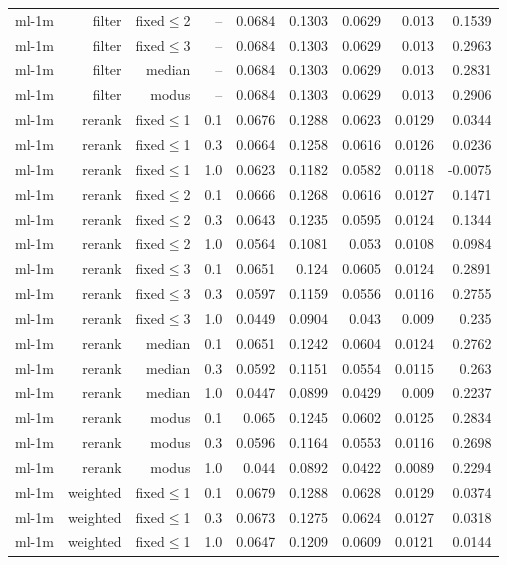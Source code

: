 \begin{longtable}{lrrrrrrrr}
ml-1m & filter & fixed$\leq$2 & -- & 0.0684 & 0.1303 & 0.0629 & 0.013 & 0.1539 \\
ml-1m & filter & fixed$\leq$3 & -- & 0.0684 & 0.1303 & 0.0629 & 0.013 & 0.2963 \\
ml-1m & filter & median & -- & 0.0684 & 0.1303 & 0.0629 & 0.013 & 0.2831 \\
ml-1m & filter & modus & -- & 0.0684 & 0.1303 & 0.0629 & 0.013 & 0.2906 \\
ml-1m & rerank & fixed$\leq$1 & 0.1 & 0.0676 & 0.1288 & 0.0623 & 0.0129 & 0.0344 \\
ml-1m & rerank & fixed$\leq$1 & 0.3 & 0.0664 & 0.1258 & 0.0616 & 0.0126 & 0.0236 \\
ml-1m & rerank & fixed$\leq$1 & 1.0 & 0.0623 & 0.1182 & 0.0582 & 0.0118 & -0.0075 \\
ml-1m & rerank & fixed$\leq$2 & 0.1 & 0.0666 & 0.1268 & 0.0616 & 0.0127 & 0.1471 \\
ml-1m & rerank & fixed$\leq$2 & 0.3 & 0.0643 & 0.1235 & 0.0595 & 0.0124 & 0.1344 \\
ml-1m & rerank & fixed$\leq$2 & 1.0 & 0.0564 & 0.1081 & 0.053 & 0.0108 & 0.0984 \\
ml-1m & rerank & fixed$\leq$3 & 0.1 & 0.0651 & 0.124 & 0.0605 & 0.0124 & 0.2891 \\
ml-1m & rerank & fixed$\leq$3 & 0.3 & 0.0597 & 0.1159 & 0.0556 & 0.0116 & 0.2755 \\
ml-1m & rerank & fixed$\leq$3 & 1.0 & 0.0449 & 0.0904 & 0.043 & 0.009 & 0.235 \\
ml-1m & rerank & median & 0.1 & 0.0651 & 0.1242 & 0.0604 & 0.0124 & 0.2762 \\
ml-1m & rerank & median & 0.3 & 0.0592 & 0.1151 & 0.0554 & 0.0115 & 0.263 \\
ml-1m & rerank & median & 1.0 & 0.0447 & 0.0899 & 0.0429 & 0.009 & 0.2237 \\
ml-1m & rerank & modus & 0.1 & 0.065 & 0.1245 & 0.0602 & 0.0125 & 0.2834 \\
ml-1m & rerank & modus & 0.3 & 0.0596 & 0.1164 & 0.0553 & 0.0116 & 0.2698 \\
ml-1m & rerank & modus & 1.0 & 0.044 & 0.0892 & 0.0422 & 0.0089 & 0.2294 \\
ml-1m & weighted & fixed$\leq$1 & 0.1 & 0.0679 & 0.1288 & 0.0628 & 0.0129 & 0.0374 \\
ml-1m & weighted & fixed$\leq$1 & 0.3 & 0.0673 & 0.1275 & 0.0624 & 0.0127 & 0.0318 \\
ml-1m & weighted & fixed$\leq$1 & 1.0 & 0.0647 & 0.1209 & 0.0609 & 0.0121 & 0.0144 \\

\end{longtable}
